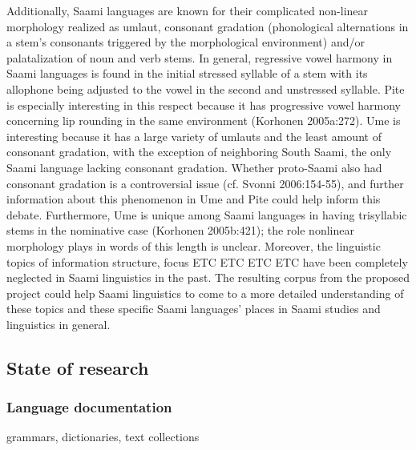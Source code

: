 \documentclass[a4paper,12pt]{article}
\begin{document}
Additionally, Saami languages are known for their complicated non-linear morphology realized as umlaut, consonant gradation (phonological alternations in a stem's consonants triggered by the morphological environment) and/or palatalization of noun and verb stems. In general, regressive vowel harmony in Saami languages is found in the initial stressed syllable of a stem with its allophone being adjusted to the vowel in the second and unstressed syllable. Pite is especially interesting in this respect because it has progressive vowel harmony concerning lip rounding in the same environment (Korhonen 2005a:272). Ume is interesting because it has a large variety of umlauts and the least amount of consonant gradation, with the exception of neighboring South Saami, the only Saami language lacking consonant gradation. Whether proto-Saami also had consonant gradation is a controversial issue (cf. Svonni 2006:154-55), and further information about this phenomenon in Ume and Pite could help inform this debate. Furthermore, Ume is unique among Saami languages in having trisyllabic stems in the nominative case (Korhonen 2005b:421); the role nonlinear morphology plays in words of this length is unclear. Moreover, the linguistic topics of information structure, focus ETC ETC ETC ETC have been completely neglected in Saami linguistics in the past.
The resulting corpus from the proposed project could help Saami linguistics to come to a more detailed understanding of %
these topics and these specific Saami languages' places in Saami studies and linguistics in general. 

\subsection{State of research}
\subsubsection{Language documentation}
grammars, dictionaries, text collections
\end{document}
